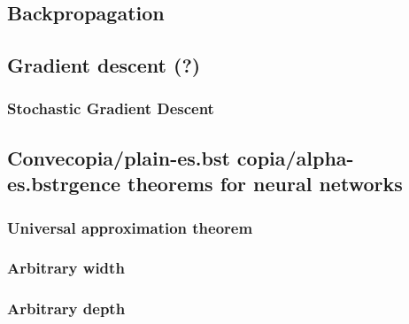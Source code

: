 \hypertarget{backpropagation}{%
\subsection{Backpropagation}\label{backpropagation}}

\hypertarget{gradient-descent}{%
\subsection{Gradient descent (?)}\label{gradient-descent}}

\hypertarget{stochastic-gradient-descent}{%
\subsubsection{Stochastic Gradient
Descent}\label{stochastic-gradient-descent}}

\hypertarget{convergence-theorems-for-neural-networks}{%
\subsection{Convecopia/plain-es.bst copia/alpha-es.bstrgence theorems for neural
networks}\label{convergence-theorems-for-neural-networks}}

\hypertarget{universal-approximation-theorem}{%
\subsubsection{Universal approximation
theorem}\label{universal-approximation-theorem}}

\hypertarget{arbitrary-width}{%
\subsubsection{Arbitrary width}\label{arbitrary-width}}

\hypertarget{arbitrary-depth}{%
\subsubsection{Arbitrary depth}\label{arbitrary-depth}}

